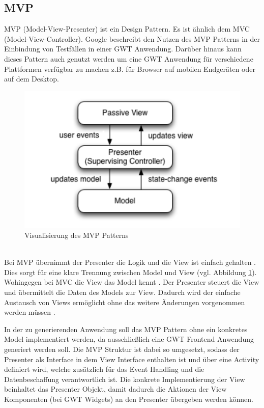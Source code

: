 \subsection{MVP}
\label{MVP}
MVP (Model-View-Presenter) ist ein Design Pattern. Es ist ähnlich dem MVC
(Model-View-Controller). Google beschreibt den Nutzen des MVP Patterns in der
Einbindung von Testfällen in einer GWT Anwendung. Darüber hinaus kann dieses
Pattern auch genutzt werden um eine GWT Anwendung für verschiedene Plattformen
verfügbar zu machen z.B. für Browser auf mobilen Endgeräten oder auf dem
Desktop.
\begin{figure}[htbp]
\begin{center}
\includegraphics{./img/MVP.pdf}
\caption{Visualisierung des MVP Patterns \cite{bib:MVP1}}\label{Fig:MVP}
\end{center}
\end{figure}\\
Bei MVP übernimmt der Presenter die Logik und die View ist einfach gehalten
\cite{bib:MVP2}. Dies sorgt für eine klare Trennung zwischen Model und View (vgl.
Abbildung \ref{Fig:MVP}). Wohingegen bei MVC die View das Model kennt
\cite{bib:MVCvsMVP}. Der Presenter steuert die View und übermittelt die Daten
des Models zur View.
Dadurch wird der einfache Austausch von Views ermöglicht ohne das weitere
Änderungen vorgenommen werden müssen \cite{bib:MVP1}\cite{bib:MVP2}.

In der zu generierenden Anwendung soll das MVP Pattern ohne ein konkretes Model
implementiert werden, da ausschließlich eine GWT Frontend Anwendung generiert
werden soll. Die MVP Struktur ist dabei so umgesetzt, sodass der Presenter als
Interface in dem View Interface enthalten ist und über eine Activity definiert
wird, welche zusätzlich für das Event Handling und die Datenbeschaffung
verantwortlich ist. Die konkrete Implementierung der View beinhaltet das
Presenter Objekt, damit dadurch die Aktionen der View Komponenten (bei GWT
Widgets) an den Presenter übergeben werden können.
